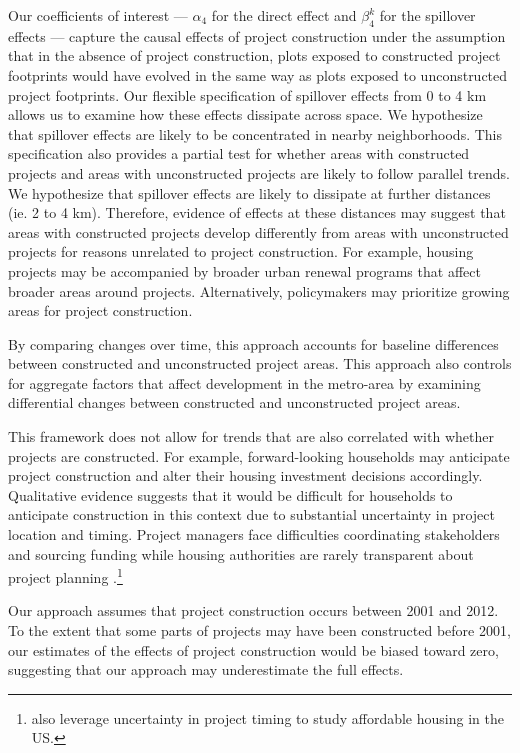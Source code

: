 \documentclass[12pt]{article}
\begin{document}
Our coefficients of interest --- $\alpha_4$ for the direct effect and $\beta_4^{k}$ for the spillover effects --- capture the causal effects of project construction under the assumption that in the absence of project construction, plots exposed to constructed project footprints would have evolved in the same way as plots exposed to unconstructed project footprints.  Our flexible specification of spillover effects from 0 to 4 km allows us to examine how these effects dissipate across space.  We hypothesize that spillover effects are likely to be concentrated in nearby neighborhoods.  This specification also provides a partial test for whether areas with constructed projects and areas with unconstructed projects are likely to follow parallel trends.  We hypothesize that spillover effects are likely to dissipate at further distances (ie. 2 to 4 km).  Therefore, evidence of effects at these distances may suggest that areas with constructed projects develop differently from areas with unconstructed projects for reasons unrelated to project construction.  For example, housing projects may be accompanied by broader urban renewal programs that affect broader areas around projects.  Alternatively, policymakers may prioritize growing areas for project construction.

By comparing changes over time, this approach accounts for baseline differences between constructed and unconstructed project areas.  This approach also controls for aggregate factors that affect development in the metro-area by examining differential changes between constructed and unconstructed project areas.  

This framework does not allow for trends that are also correlated with whether projects are constructed.  For example, forward-looking households may anticipate project construction and alter their housing investment decisions accordingly.  Qualitative evidence suggests that it would be difficult for households to anticipate construction in this context due to substantial uncertainty in project location and timing.  Project managers face difficulties coordinating stakeholders and sourcing funding while housing authorities are rarely transparent about project planning \citep{serihistory}.\footnote{\cite{diamond2019wants} also leverage uncertainty in project timing to study affordable housing in the US.} 

Our approach assumes that project construction occurs between 2001 and 2012.  To the extent that some parts of projects may have been constructed before 2001, our estimates of the effects of project construction would be biased toward zero, suggesting that our approach may underestimate the full effects.
\end{document}
